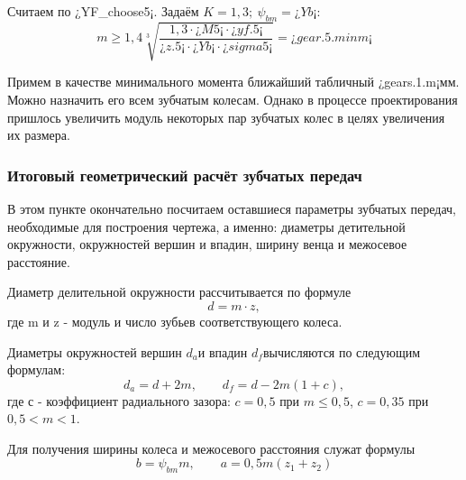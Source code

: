 \documentclass[14pt,a4paper,russian]{scrartcl}
\begin{document}
        Считаем по ¿YF_choose5¡. Задаём \( K=1,3;\ \psi_{bm}=¿Yb¡ \):
        \[ m \geq 1,4\sqrt[3]{\frac{1,3\cdot ¿M5¡\cdot ¿yf.5¡}{¿z.5¡\cdot ¿Yb¡\cdot ¿sigma5¡}}=¿gear.5.minm¡ \]
        
        Примем в качестве минимального момента ближайший табличный ¿gears.1.m¡мм. Можно назначить его
        всем зубчатым колесам. Однако в процессе проектирования пришлось увеличить модуль некоторых
        пар зубчатых колес в целях увеличения их размера.

    
    \subsubsection{Итоговый геометрический расчёт зубчатых передач}
        В этом пункте окончательно посчитаем оставшиеся параметры зубчатых передач,
        необходимые для построения чертежа, а именно: диаметры детительной окружности, окружностей вершин
        и впадин, ширину венца и межосевое расстояние.\par

        Диаметр делительной окружности рассчитывается по формуле
        \[ d = m\cdot z, \]
        где m и z - модуль и число зубьев соответствующего колеса.\par

        Диаметры окружностей вершин \( d_a \)и впадин \( d_f \)вычисляются по следующим формулам:
        \[ d_a = d + 2m,\qquad d_f = d - 2m(1+c),\]
        где с - коэффициент радиального зазора: 
            \( c=0,5 \) при \( m\leq 0,5 \), \( c=0,35 \) при \( 0,5<m<1 \).
        
        Для получения ширины колеса и межосевого расстояния служат формулы
        \[ b=\psi_{bm}m, \qquad  a = 0,5m(z_1+z_2)\]
        
\end{document}
